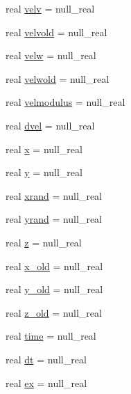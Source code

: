 \begin{DoxyCompactItemize}
real \mbox{\hyperlink{structmodulejet_1_1t__evolution_aaa1980cc14bd627592f0bd5769a02216}{velv}} = null\+\_\+real
\item 
real \mbox{\hyperlink{structmodulejet_1_1t__evolution_a6a956a938a87f44cea8bb5fa30c37cc4}{velvold}} = null\+\_\+real
\item 
real \mbox{\hyperlink{structmodulejet_1_1t__evolution_ac3789b459e29ba0b43dee98286c5eb6b}{velw}} = null\+\_\+real
\item 
real \mbox{\hyperlink{structmodulejet_1_1t__evolution_a61c30b79c77300288528a1db30fd0c9f}{velwold}} = null\+\_\+real
\item 
real \mbox{\hyperlink{structmodulejet_1_1t__evolution_aa3b092b452f9b9bfbcf4b6404081d8a7}{velmodulus}} = null\+\_\+real
\item 
real \mbox{\hyperlink{structmodulejet_1_1t__evolution_a18bd7bed26fd91cc6ab1c9a798e05ed0}{dvel}} = null\+\_\+real
\item 
real \mbox{\hyperlink{structmodulejet_1_1t__evolution_ae0a3887ead85dae8ddfb14ff661e3acb}{x}} = null\+\_\+real
\item 
real \mbox{\hyperlink{structmodulejet_1_1t__evolution_a953781bae873fe456be99bc9bc07f4cf}{y}} = null\+\_\+real
\item 
real \mbox{\hyperlink{structmodulejet_1_1t__evolution_ac679cc5589a077d305c9fbb8381467de}{xrand}} = null\+\_\+real
\item 
real \mbox{\hyperlink{structmodulejet_1_1t__evolution_a97c679f85e2b7ebc2a2a99793659235a}{yrand}} = null\+\_\+real
\item 
real \mbox{\hyperlink{structmodulejet_1_1t__evolution_a12c42ad6a284b789da029b9b1142f29a}{z}} = null\+\_\+real
\item 
real \mbox{\hyperlink{structmodulejet_1_1t__evolution_a8c25f45158a9ee757c8c34524caef332}{x\+\_\+old}} = null\+\_\+real
\item 
real \mbox{\hyperlink{structmodulejet_1_1t__evolution_a8990abd0ff8e87e738285148b4f5f114}{y\+\_\+old}} = null\+\_\+real
\item 
real \mbox{\hyperlink{structmodulejet_1_1t__evolution_af05890f0d7517f6a2ccd592b16cc6580}{z\+\_\+old}} = null\+\_\+real
\item 
real \mbox{\hyperlink{structmodulejet_1_1t__evolution_a1ddbae921473e02f19c68ce0145c0355}{time}} = null\+\_\+real
\item 
real \mbox{\hyperlink{structmodulejet_1_1t__evolution_a821ba325aab8771fe9c6a15f2dd99558}{dt}} = null\+\_\+real
\item 
real \mbox{\hyperlink{structmodulejet_1_1t__evolution_a056cfdfa2a9f7ae216d9471b9250eb40}{ex}} = null\+\_\+real

\end{DoxyCompactItemize}
